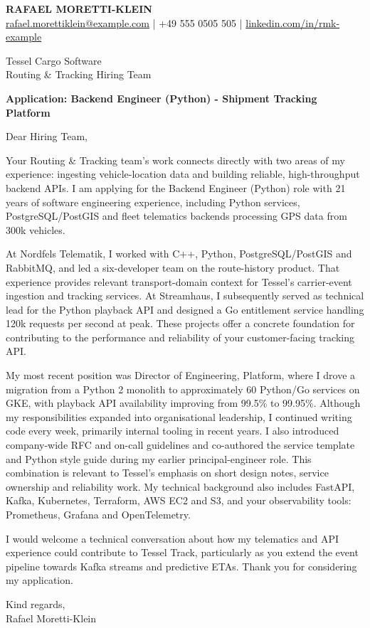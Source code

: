 \documentclass[11pt,a4paper]{article}
\begin{document}
{\Large\bfseries\color{primarycolor} RAFAEL MORETTI-KLEIN}\\
{\small \href{mailto:rafael.morettiklein@example.com}{rafael.morettiklein@example.com} | +49 555 0505 505 | \href{https://linkedin.com/in/rmk-example}{linkedin.com/in/rmk-example}}

Tessel Cargo Software\\
Routing \& Tracking Hiring Team

\textbf{Application: Backend Engineer (Python) - Shipment Tracking Platform}

Dear Hiring Team,

Your Routing \& Tracking team's work connects directly with two areas of my experience: ingesting vehicle-location data and building reliable, high-throughput backend APIs. I am applying for the Backend Engineer (Python) role with 21 years of software engineering experience, including Python services, PostgreSQL/PostGIS and fleet telematics backends processing GPS data from 300k vehicles.

At Nordfels Telematik, I worked with C++, Python, PostgreSQL/PostGIS and RabbitMQ, and led a six-developer team on the route-history product. That experience provides relevant transport-domain context for Tessel's carrier-event ingestion and tracking services. At Streamhaus, I subsequently served as technical lead for the Python playback API and designed a Go entitlement service handling 120k requests per second at peak. These projects offer a concrete foundation for contributing to the performance and reliability of your customer-facing tracking API.

My most recent position was Director of Engineering, Platform, where I drove a migration from a Python 2 monolith to approximately 60 Python/Go services on GKE, with playback API availability improving from 99.5\% to 99.95\%. Although my responsibilities expanded into organisational leadership, I continued writing code every week, primarily internal tooling in recent years. I also introduced company-wide RFC and on-call guidelines and co-authored the service template and Python style guide during my earlier principal-engineer role. This combination is relevant to Tessel's emphasis on short design notes, service ownership and reliability work. My technical background also includes FastAPI, Kafka, Kubernetes, Terraform, AWS EC2 and S3, and your observability tools: Prometheus, Grafana and OpenTelemetry.

I would welcome a technical conversation about how my telematics and API experience could contribute to Tessel Track, particularly as you extend the event pipeline towards Kafka streams and predictive ETAs. Thank you for considering my application.

Kind regards,\\
Rafael Moretti-Klein
\end{document}
